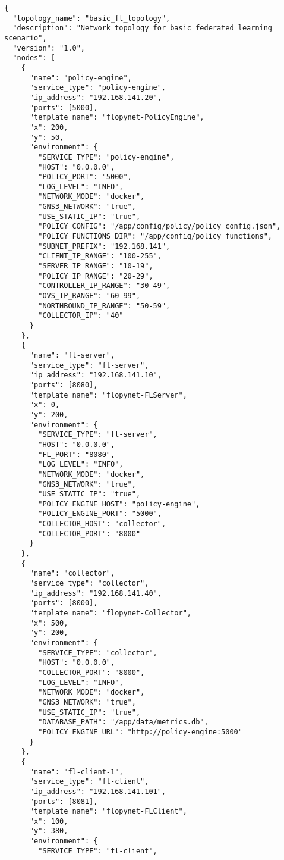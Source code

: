 \begin{lstlisting}[style=jsoncode, caption=Basic Topology Configuration Template]
{
  "topology_name": "basic_fl_topology",
  "description": "Network topology for basic federated learning scenario",
  "version": "1.0",
  "nodes": [
    {
      "name": "policy-engine",
      "service_type": "policy-engine",
      "ip_address": "192.168.141.20",
      "ports": [5000],
      "template_name": "flopynet-PolicyEngine",
      "x": 200,
      "y": 50,
      "environment": {
        "SERVICE_TYPE": "policy-engine",
        "HOST": "0.0.0.0",
        "POLICY_PORT": "5000",
        "LOG_LEVEL": "INFO",
        "NETWORK_MODE": "docker",
        "GNS3_NETWORK": "true",
        "USE_STATIC_IP": "true",
        "POLICY_CONFIG": "/app/config/policy/policy_config.json",
        "POLICY_FUNCTIONS_DIR": "/app/config/policy_functions",
        "SUBNET_PREFIX": "192.168.141",
        "CLIENT_IP_RANGE": "100-255",
        "SERVER_IP_RANGE": "10-19",
        "POLICY_IP_RANGE": "20-29",
        "CONTROLLER_IP_RANGE": "30-49",
        "OVS_IP_RANGE": "60-99",
        "NORTHBOUND_IP_RANGE": "50-59",
        "COLLECTOR_IP": "40"
      }
    },
    {
      "name": "fl-server",
      "service_type": "fl-server",
      "ip_address": "192.168.141.10",
      "ports": [8080],
      "template_name": "flopynet-FLServer",
      "x": 0,
      "y": 200,
      "environment": {
        "SERVICE_TYPE": "fl-server",
        "HOST": "0.0.0.0",
        "FL_PORT": "8080",
        "LOG_LEVEL": "INFO",
        "NETWORK_MODE": "docker",
        "GNS3_NETWORK": "true",
        "USE_STATIC_IP": "true",
        "POLICY_ENGINE_HOST": "policy-engine",
        "POLICY_ENGINE_PORT": "5000",
        "COLLECTOR_HOST": "collector",
        "COLLECTOR_PORT": "8000"
      }
    },
    {
      "name": "collector",
      "service_type": "collector",
      "ip_address": "192.168.141.40",
      "ports": [8000],
      "template_name": "flopynet-Collector",
      "x": 500,
      "y": 200,
      "environment": {
        "SERVICE_TYPE": "collector",
        "HOST": "0.0.0.0",
        "COLLECTOR_PORT": "8000",
        "LOG_LEVEL": "INFO",
        "NETWORK_MODE": "docker",
        "GNS3_NETWORK": "true",
        "USE_STATIC_IP": "true",
        "DATABASE_PATH": "/app/data/metrics.db",
        "POLICY_ENGINE_URL": "http://policy-engine:5000"
      }
    },
    {
      "name": "fl-client-1",
      "service_type": "fl-client",
      "ip_address": "192.168.141.101",
      "ports": [8081],
      "template_name": "flopynet-FLClient",
      "x": 100,
      "y": 380,
      "environment": {
        "SERVICE_TYPE": "fl-client",

\end{lstlisting}
